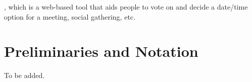 , which is a web-based tool that aids people to vote on and decide a date/time option for a meeting, social gathering, etc. 

\section{Preliminaries and Notation}

To be added.

